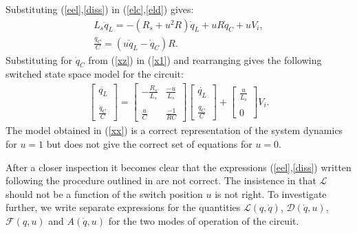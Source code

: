 \documentclass[preprint,12pt]{elsarticle}
\begin{document}
Substituting (\ref{eel},\ref{diss}) in (\ref{elc},\ref{eld}) gives:
\begin{eqnarray} \label{x1}
L_s\ddot{q}_L=-(R_s+u^2R)\dot{q}_L+uR\dot{q}_C+uV_i,\\ 
\frac{q_C}{C}=(u\dot{q}_L-\dot{q}_C)R. \label{xz}
\end{eqnarray}
Substituting for $\dot{q}_C$ from (\ref{xz}) in (\ref{x1}) and rearranging gives the following switched state space model for the circuit:  
\begin{eqnarray}\label{xx}
\left[\begin{array}{c}
\ddot{q_L}\\ \\
\frac{\dot{q}_C}{C}
\end{array}\right]=\left[\begin{array}{cc}-\frac{R_s}{L_s}&\frac{-u}{L_s}\\ \\\frac{u}{C}&\frac{-1}{RC}\end{array}\right]\left[\begin{array}{c}
\dot{q_L}\\ \\
\frac{q_C}{C}\end{array}\right]+\left[\begin{array}{c}
\frac{u}{L_s}\\ \\
0
\end{array}\right]V_i.
\end{eqnarray}
The model obtained in (\ref{xx}) is a correct representation of the system dynamics for $u=1$ but does not give the correct set of equations for $u=0$.

After a closer inspection it becomes clear that the expressions (\ref{eel},\ref{diss}) written following the procedure outlined in \cite{scherpen_2003} are not correct. The insistence in \cite{scherpen_2003} that $\mathcal{L}$ should not be a function of the switch position $u$ is not right. To investigate further, we write separate expressions for the quantities $\mathcal{L}(q,\dot{q})$, $\mathcal{D}(\dot{q},u)$, $\mathcal{F}(q,u)$ and $A(\dot{q},u)$ for the two modes of operation of the circuit.
\end{document}
